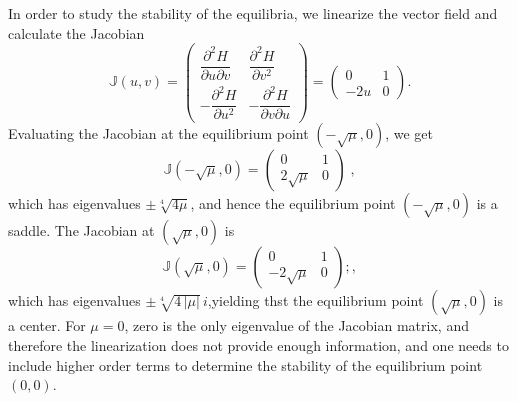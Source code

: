 \documentclass{ws-ijbc}
\begin{document}
In order to study the stability of the equilibria, we linearize the vector field and calculate the Jacobian 
\begin{equation}
\mathbb{J}(u,v) = 
\begin{pmatrix}
\dfrac{\partial^2 H}{\partial u \partial v} & \dfrac{\partial^2 H}{\partial v^2} \\[.3cm]
-\dfrac{\partial^2 H}{\partial u^2} & -\dfrac{\partial^2 H}{\partial v \partial u}
\end{pmatrix} = 
\begin{pmatrix}
0 & 1 \\
-2 u & 0
\end{pmatrix}.
\end{equation}
Evaluating the Jacobian at the equilibrium point $(-\sqrt{\mu},0)$, we get
\begin{equation}
\mathbb{J}(-\sqrt{\mu},0) = 
\begin{pmatrix}
0 & 1 \\
2 \sqrt{\mu} & 0
\end{pmatrix} \;,
\end{equation}
which has eigenvalues $\pm \sqrt[4]{4\mu}$, and hence the equilibrium point $(-\sqrt{\mu},0)$ is a saddle. The Jacobian at $(\sqrt{\mu},0)$ is
\begin{equation}
\mathbb{J}(\sqrt{\mu},0) = 
\begin{pmatrix}
0 & 1 \\
-2 \sqrt{\mu} & 0
\end{pmatrix};,    
\end{equation}
which has eigenvalues $\pm \sqrt[4]{4 \, |\mu|} \, i$,yielding thst the equilibrium point $(\sqrt{\mu},0)$ is a center. For $\mu = 0$, zero is the only eigenvalue of the Jacobian matrix, and therefore the linearization does not provide enough information, and one needs to include higher order terms to determine the stability of the equilibrium point $(0,0)$.
\end{document}
